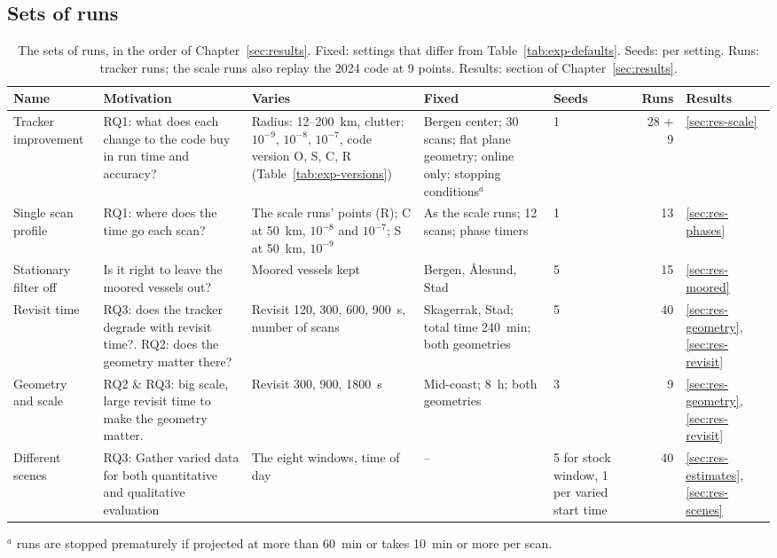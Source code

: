 \subsection{Sets of runs}
\label{sec:exp-runs}

\begin{table}[htbp]
\centering
\caption{The sets of runs, in the order of Chapter~\ref{sec:results}. Fixed: settings that differ from Table~\ref{tab:exp-defaults}. Seeds: per setting. Runs: tracker runs; the scale runs also replay the 2024 code at 9 points. Results: section of Chapter~\ref{sec:results}.}
\label{tab:exp-runs}
\footnotesize
\setlength{\tabcolsep}{4pt}
\begin{tabularx}{\textwidth}{>{\raggedright\arraybackslash}p{1.6cm} >{\raggedright\arraybackslash}X >{\raggedright\arraybackslash}X >{\raggedright\arraybackslash}X X r l}
\toprule
Name & Motivation & Varies & Fixed & Seeds & Runs & Results \\
\midrule
Tracker improvement & RQ1: what does each change to the code buy in run time and accuracy? & Radius: 12--200~km, clutter: $10^{-9}$, $10^{-8}$, $10^{-7}$, code version O, S, C, R (Table~\ref{tab:exp-versions}) & Bergen center; 30 scans; flat plane geometry; online only; stopping conditions$^a$ & 1 & 28 + 9 & \ref{sec:res-scale} \\
\addlinespace
Single scan profile & RQ1: where does the time go each scan? & The scale runs' points (R); C at 50~km, $10^{-8}$ and $10^{-7}$; S at 50~km, $10^{-9}$ & As the scale runs; 12 scans; phase timers & 1 & 13 & \ref{sec:res-phases} \\
\addlinespace
Stationary filter off & Is it right to leave the moored vessels out? & Moored vessels kept & Bergen, Ålesund, Stad & 5 & 15 & \ref{sec:res-moored} \\
\addlinespace
Revisit time & RQ3: does the tracker degrade with revisit time?. RQ2: does the geometry matter there? & Revisit 120, 300, 600, 900~s, number of scans & Skagerrak, Stad; total time 240~min; both geometries & 5 & 40 & \ref{sec:res-geometry}, \ref{sec:res-revisit} \\
\addlinespace
Geometry and scale & RQ2 \& RQ3: big scale, large revisit time to make the geometry matter. & Revisit 300, 900, 1800~s & Mid-coast; 8~h; both geometries & 3 & 9 & \ref{sec:res-geometry}, \ref{sec:res-revisit} \\
\addlinespace
Different scenes & RQ3: Gather varied data for both quantitative and qualitative evaluation & The eight windows, time of day & -- & 5 for stock window, 1 per varied start time & 40 & \ref{sec:res-estimates}, \ref{sec:res-scenes} \\
\bottomrule
\end{tabularx}

\smallskip
\footnotesize
$^a$ runs are stopped prematurely if projected at more than 60~min or takes 10~min or more per scan.
\end{table}

